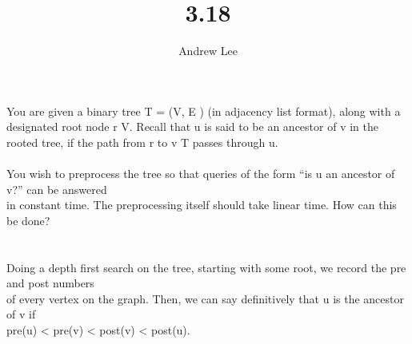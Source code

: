 \documentclass[10pt,a4paper,oneside]{article}
\begin{document}
\title{3.18}\author{Andrew Lee}\maketitle{}
\textrm{You are given a binary tree }T = (V, E ) \textrm{(in adjacency list format), along with a designated root node }r \in V\textrm{. Recall that }u \textrm{ is said to be an ancestor of }v\textrm{ in the rooted tree, if the path from }r \textrm{ to } v \in \textrm{ T passes through }u\textrm{.}\\\\
\textrm{You wish to preprocess the tree so that queries of the form ``is u an ancestor of v?'' can be answered}\\\textrm{in constant time. The preprocessing itself should take linear time. How can this be done?}\\\\\\
\textrm{Doing a depth first search on the tree, starting with some root, we record the pre and post numbers}\\\textrm{of every vertex on the graph. Then, we can say definitively that u is the ancestor of v if }\\pre(u) < pre(v) < post(v) < post(u)\textrm{.}
\end{document}
